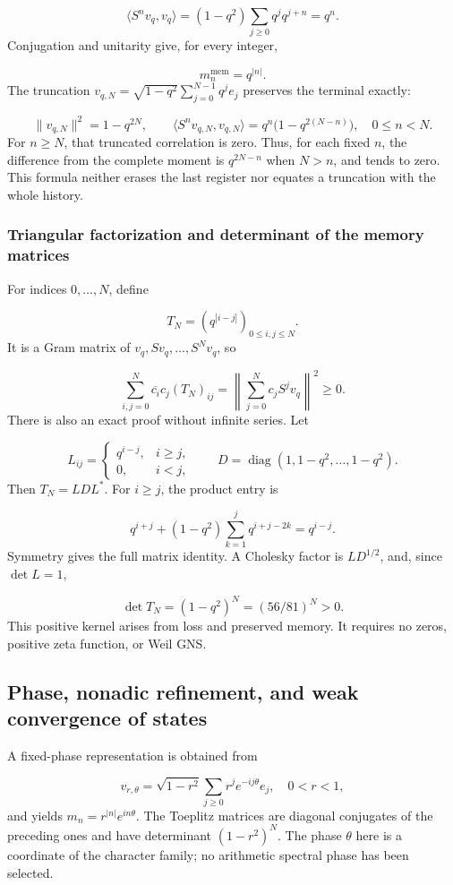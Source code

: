 \[
\langle S^n v_q,v_q\rangle
=(1-q^2)\sum_{j\ge0}q^j q^{j+n}=q^n.
\]
Conjugation and unitarity give, for every integer,

\[
\boxed{m_n^{\mathrm{mem}}=q^{|n|}.}
\]
The truncation \(v_{q,N}=\sqrt{1-q^2}\sum_{j=0}^{N-1}q^j e_j\) preserves the terminal exactly:

\[
\|v_{q,N}\|^2=1-q^{2N},\qquad
\langle S^n v_{q,N},v_{q,N}\rangle
=q^n\bigl(1-q^{2(N-n)}\bigr),\quad 0\le n<N.
\]
For \(n\ge N\), that truncated correlation is zero. Thus, for each fixed \(n\), the difference from the complete moment is \(q^{2N-n}\) when \(N>n\), and tends to zero. This formula neither erases the last register nor equates a truncation with the whole history.


\subsubsection{Triangular factorization and determinant of the memory matrices}
\label{viii:tm-add-m2-2}
For indices \(0,\ldots,N\), define

\[
T_N=(q^{|i-j|})_{0\le i,j\le N}.
\]
It is a Gram matrix of \(v_q,Sv_q,\ldots,S^Nv_q\), so

\[
\sum_{i,j=0}^{N}\overline{c_i}c_j(T_N)_{ij}
=\left\|\sum_{j=0}^{N}c_jS^jv_q\right\|^2\ge0.
\]
There is also an exact proof without infinite series. Let

\[
L_{ij}=\begin{cases}q^{i-j},&i\ge j,\\0,&i<j,\end{cases}
\qquad D=\operatorname{diag}(1,1-q^2,\ldots,1-q^2).
\]
Then \(T_N=LDL^*\). For \(i\ge j\), the product entry is

\[
q^{i+j}+(1-q^2)\sum_{k=1}^{j}q^{i+j-2k}
=q^{i-j}.
\]
Symmetry gives the full matrix identity. A Cholesky factor is \(L D^{1/2}\), and, since \(\det L=1\),

\[
\boxed{\det T_N=(1-q^2)^N=(56/81)^N>0.}
\]
This positive kernel arises from loss and preserved memory. It requires no zeros, positive zeta function, or Weil GNS.


\subsection{Phase, nonadic refinement, and weak convergence of states}
\label{viii:tm-add-m3}
A fixed-phase representation is obtained from

\[
v_{r,\theta}=\sqrt{1-r^2}\sum_{j\ge0}r^j e^{-ij\theta}e_j,
\quad 0<r<1,
\]
and yields \(m_n=r^{|n|}e^{in\theta}\). The Toeplitz matrices are diagonal conjugates of the preceding ones and have determinant \((1-r^2)^N\). The phase \(\theta\) here is a coordinate of the character family; no arithmetic spectral phase has been selected.

